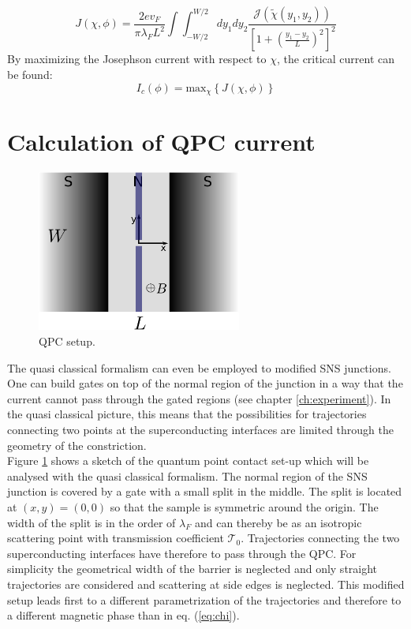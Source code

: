 \begin{equation}
J\left(\chi, \phi \right) = \frac{2 e v_F}{\pi \lambda_F L^2}  \int \int_{-W/2}^{W/2} d y_1 d y_2 \frac{\mathcal{J}(\tilde{\chi}(y_1, y_2))}{\left[ 1 + \left(\frac{y_1 - y_2}{L}\right)^2\right]^2}
\label{eq:josephson_current}
\end{equation}
By maximizing the Josephson current with respect to $\chi$, the critical current can be found:
\begin{equation}
I_c(\phi) = \text{max}_{\chi}\left\{ J(\chi, \phi) \right\}
\end{equation}

\section{Calculation of QPC current}
\begin{figure}
\centering
\includegraphics[width=0.6\textwidth]{figure/analyticalmodel/qpc_sns_junction}
\caption{QPC setup.}
\label{fig:qpc_sns_schematic}
\end{figure}
The quasi classical formalism can even be employed to modified SNS junctions. One can build gates on top of the normal region of the junction in a way that the current cannot pass through the gated regions (see chapter \ref{ch:experiment}). In the quasi classical picture, this means that the possibilities for trajectories connecting two points at the superconducting interfaces are limited through the geometry of the constriction.\\
Figure \ref{fig:qpc_sns_schematic} shows a sketch of the quantum point contact set-up which will be analysed with the quasi classical formalism. The normal region of the SNS junction is covered by a gate with a small split in the middle. The split is located at $(x, y) = (0, 0)$ so that the sample is symmetric around the origin. The width of the split is in the order of $\lambda_F$  and can thereby be  as an isotropic scattering point with transmission coefficient $\mathcal{T}_0$. Trajectories connecting the two superconducting interfaces have therefore to pass through the QPC. For simplicity the geometrical width of the barrier is neglected and only straight trajectories are considered and scattering at side edges is neglected. This modified setup leads first to a different parametrization of the trajectories and therefore to a different magnetic phase than in eq. (\ref{eq:chi}).\\
